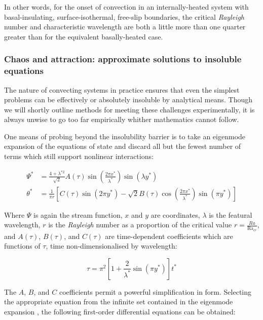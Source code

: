 \documentclass[a4paper,11pt,oneside]{book}
\begin{document}
\cite{Roberts1967-aq}

In other words, for the onset of convection in an internally-heated system with basal-insulating, surface-isothermal, free-slip boundaries, the critical \textit{Rayleigh} number and characteristic wavelength are both a little more than one quarter greater than for the equivalent basally-heated case.

\subsubsection{Chaos and attraction: approximate solutions to insoluble equations}

The nature of convecting systems in practice ensures that even the simplest problems can be effectively or absolutely insoluble by analytical means. Though we will shortly outline methods for meeting these challenges experimentally, it is always unwise to go too far empirically whither mathematics cannot follow.

One means of probing beyond the insolubility barrier is to take an eigenmode expansion of the equations of state and discard all but the fewest number of terms which still support nonlinear interactions:

\begin{align*}
\Psi^* &= \frac{4 + \lambda^{*2}}{\sqrt{2}} A(\tau) \sin \left( \frac{2 \pi x^*}{\lambda^*} \right) \sin \left( \lambda y^* \right) \\
\theta^* &= \frac{1}{\pi r} \left[ C(\tau) \sin \left( 2 \pi y^* \right) - \sqrt{2} B(\tau) \cos \left( \frac{2 \pi x^*}{\lambda^*} \right) \sin \left( \pi y^* \right) \right]
\end{align*}

Where $\Psi$ is again the stream function, $x$ and $y$ are coordinates, $\lambda$ is the featural wavelength, $r$ is the \textit{Rayleigh} number as a proportion of the critical value $r = \frac{Ra}{\mathrm{Ra}_{cr}}$, and $A(\tau)$, $B(\tau)$, and $C(\tau)$ are time-dependent coefficients which are functions of $\tau$, time non-dimensionalised by wavelength:

\begin{equation}
\tau = \pi^2 \left[ 1 + \frac{2}{\lambda^*} \sin \left( \pi y^* \right) \right] t^*
\end{equation}

The $A$, $B$, and $C$ coefficients permit a powerful simplification in form. Selecting the appropriate equation from the infinite set contained in the eigenmode expansion \cite{Schubert2001-ea}, the following first-order differential equations can be obtained:
\end{document}
